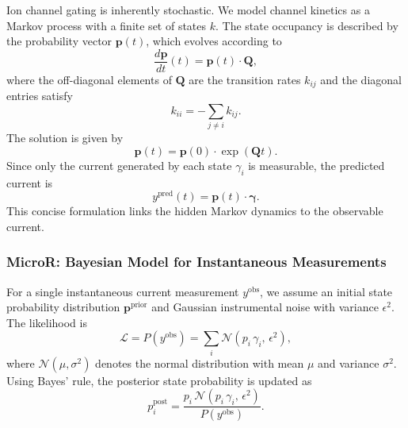 \documentclass[pdflatex,sn-mathphys-num]{sn-jnl}%
\theoremstyle{thmstyleone}%
\theoremstyle{thmstyletwo}%
\theoremstyle{thmstylethree}%
\begin{document}
Ion channel gating is inherently stochastic. We model channel kinetics as a Markov process with a finite set of states \(k\). The state occupancy is described by the probability vector \(\boldsymbol{p}(t)\), which evolves according to
\begin{equation}
	\frac{d\boldsymbol{p}}{dt}(t) = \boldsymbol{p}(t)\cdot \boldsymbol{Q},
	\label{eq:master_equation_short}
\end{equation}
where the off-diagonal elements of \(\boldsymbol{Q}\) are the transition rates \(k_{ij}\) and the diagonal entries satisfy
\begin{equation}
	k_{ii} = -\sum_{j\neq i} k_{ij}.
	\label{eq:Q_diag_short}
\end{equation}
The solution is given by
\begin{equation}
	\boldsymbol{p}(t) = \boldsymbol{p}(0) \cdot \exp(\boldsymbol{Q}t).
	\label{eq:solution_short}
\end{equation}
Since only the current generated by each state \(\gamma_i\) is measurable, the predicted current is
\begin{equation}
	y^{\text{pred}}(t) = \boldsymbol{p}(t)\cdot \boldsymbol{\gamma}.
	\label{eq:current_pred_short}
\end{equation}
This concise formulation links the hidden Markov dynamics to the observable current.

\subsubsection{MicroR: Bayesian Model for Instantaneous Measurements}

For a single instantaneous current measurement \(y^{\text{obs}}\), we assume an initial state probability distribution \(\boldsymbol{p}^{\text{prior}}\) and Gaussian instrumental noise with variance \(\epsilon^2\). The likelihood is
\begin{equation}
	\mathcal{L} = P(y^{\text{obs}}) = \sum_i \mathcal{N}(p_i\,\gamma_i,\,\epsilon^2),
	\label{eq:single_channel_likelihood_short}
\end{equation}
where \(\mathcal{N}(\mu,\sigma^2)\) denotes the normal distribution with mean \(\mu\) and variance \(\sigma^2\). Using Bayes' rule, the posterior state probability is updated as
\begin{equation}
	p^{\text{post}}_i = \frac{p_i\,\mathcal{N}(p_i\,\gamma_i,\,\epsilon^2)}{P(y^{\text{obs}})}.
	\label{eq:single_channel_posterior_short}
\end{equation}
\end{document}
